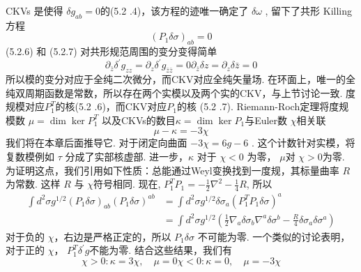 CKVs 是使得 $\delta g_{a b}=0 $的(5.2 .4)，该方程的迹唯一确定了 $\delta \omega$ , 留下了共形 Killing 方程
\begin{equation}
	\left(P_{1} \delta \sigma\right)_{a b}=0
\end{equation}
(5.2.6) 和 (5.2.7) 对共形规范周围的变分变得简单
\begin{subequations}
\begin{equation}
\partial_{\bar{z}} \delta^{\prime} g_{z z} =\partial_{z} \delta^{\prime} g_{\bar{z} \bar{z}}=0 
\end{equation}	
\begin{equation}
\partial_{\bar{z}} \delta z =\partial_{z} \delta \bar{z}=0
\end{equation}			
\end{subequations}
所以模的变分对应于全纯二次微分，而CKV对应全纯矢量场. 在环面上，唯一的全纯双周期函数是常数，所以存在两个实模以及两个实的CKV，与上节讨论一致.
度规模对应$P_{1}^{T}$的核(5.2 .6)，而CKV对应$P_{1}$的核 (5.2 .7). Riemann-Roch定理将度规模数 $\mu=\operatorname{dim} \operatorname{ker} P_{1}^{T}$ 以及CKVs的数目$ \kappa=\operatorname{dim} \operatorname{ker} P_{1}$与Euler数 $\chi$相关联
\begin{equation}
	\mu-\kappa=-3 \chi
\end{equation}
我们将在本章后面推导它. 对于闭定向曲面 $-3 \chi=6 g-6 $ . 这个计数针对实模，将复数模例如 $\tau$ 分成了实部核虚部.
进一步，$\kappa$ 对于 $\chi<0$ 为零， $\mu$对 $\chi>0 $为零. 为证明这点，我们引用如下性质：总能通过Weyl变换找到一度规，其标量曲率 $R$ 为常数. 这样 $R$ 与 $\chi$符号相同. 现在, $P_{1}^{T} P_{1}=-\frac{1}{2} \nabla^{2}-\frac{1}{4} R$, 所以
\begin{equation}
	\begin{aligned}
		\int d^{2} \sigma g^{1 / 2}\left(P_{1} \delta \sigma\right)_{a b}\left(P_{1} \delta \sigma\right)^{a b} &=\int d^{2} \sigma g^{1 / 2} \delta \sigma_{a}\left(P_{1}^{T} P_{1} \delta \sigma\right)^{a} \\
		&=\int d^{2} \sigma g^{1 / 2}\left(\frac{1}{2} \nabla_{a} \delta \sigma_{b} \nabla^{a} \delta \sigma^{b}-\frac{R}{4} \delta \sigma_{a} \delta \sigma^{a}\right)
	\end{aligned}
\end{equation}
对于负的 $\chi$，右边是严格正定的，所以 $P_{1} \delta \sigma$ 不可能为零. 一个类似的讨论表明，对于正的 $\chi$， $P_{1}^{T} \delta^{\prime} g$不能为零. 结合这些结果，我们有
\begin{subequations}
\begin{equation}
\chi>0:  \kappa=3 \chi, \quad \mu=0 
\end{equation}
\begin{equation}
\chi<0:  \kappa=0, \quad \mu=-3 \chi
\end{equation}						
\end{subequations}

